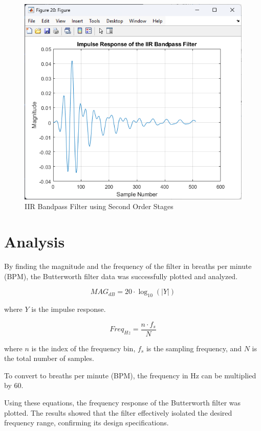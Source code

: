 \documentclass[journal]{IEEEtran}
\begin{document}
\begin{figure}[H]
    \centering
    \includegraphics[width=\linewidth]{BandpassSOSImpulse.png}
    \caption{IIR Bandpass Filter using Second Order Stages}
    \label{fig:band_pass_sos}
\end{figure}

\section{Analysis}
By finding the magnitude and the frequency of the filter in breaths per minute (BPM), the Butterworth filter data was successfully plotted and analyzed.

\begin{equation}
    MAG_{dB} = 20 \cdot \log_{10} \left( \lvert Y \rvert \right)
\end{equation}

where $Y$ is the impulse response.

\begin{equation}
    Freq_{Hz} = \frac{n \cdot f_s}{N}
\end{equation}

where $n$ is the index of the frequency bin, $f_s$ is the sampling frequency, and $N$ is the total number of samples.

To convert to breaths per minute (BPM), the frequency in Hz can be multiplied by 60.

Using these equations, the frequency response of the Butterworth filter was plotted. The results showed that the filter effectively isolated the desired frequency range, confirming its design specifications.
\end{document}

